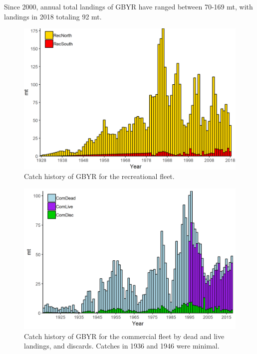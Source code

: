 \documentclass[12pt,]{article}
\begin{document}
Since 2000, annual total landings of GBYR have ranged between 70-169 mt,
with landings in 2018 totaling 92 mt.

\FloatBarrier

\begin{figure}
\centering
\includegraphics{Figures/rec_exec.png}
\caption{Catch history of GBYR for the recreational fleet.
\label{fig:Exec_catch1}}
\end{figure}

\begin{figure}
\centering
\includegraphics{Figures/comm_exec.png}
\caption{Catch history of GBYR for the commercial fleet by dead and live
landings, and discards. Catches in 1936 and 1946 were minimal.
\label{fig:Exec_catch2}}
\end{figure}

\FloatBarrier
\end{document}
